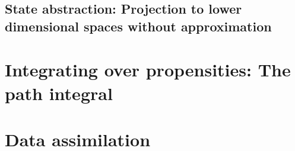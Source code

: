 \documentclass[letterpaper,twocolumn,10pt]{article}
\begin{document}
\subsection{State abstraction: Projection to lower dimensional spaces without approximation}


\section{Integrating over propensities: The path integral}

\section{Data assimilation}

\begin{comment}
\section{ABM as a computational paradigm}

We define an ABM as a set of (Turing complete) computational processes, which we call \textit{agents}. Without loss of generality, we assume that each agent is executing the same program, although their internal states may differ. In addition, there is an \textit{environment} which has a finite state and a \textit{public API} through which any agent may perform actions or query for information. Similarly, the each agent has a public API through which the environment may act on the agent or gain information about the state of the agent. The environment can also create or annihilate agents.

Computation proceeds in three modes
\begin{description}

\item[Synchronous mode] In which each agent gets to perform computations and act on the environment through repeated execution of a \textit{timestep} function. For each timestep of the whole model, the state of the environment is only updated once per timestep.

\item[Sequential mode] In which each agent has a unique identity which has an ordering. Computation proceeds through repeated execution of each agent's timestep function \textbf{in order of their identity}. This time the environment is updated immediately as agents act upon it.

\item[Asymchronous mode] In which each agent is a separate process which communicates with the environment through asynchronous message passing. We will not consider this mode in this paper.


\end{comment}
\end{document}
